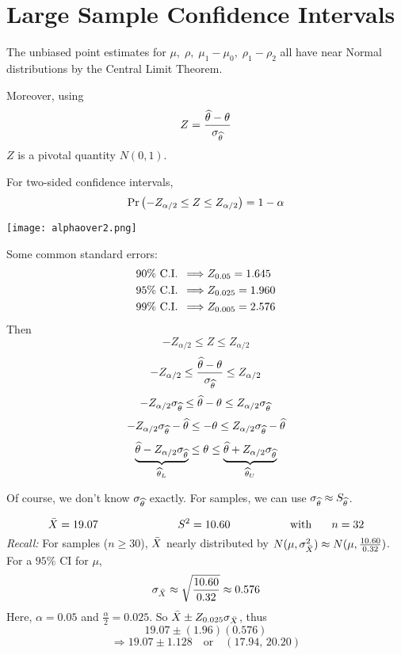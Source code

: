 \section{Large Sample Confidence Intervals}
   The unbiased point estimates for $\mu,\; \rho,\; \mu_1 - \mu_0,\; \rho_1 - \rho_2$ all have near Normal distributions by the Central Limit Theorem.
   
   \nl Moreover, using
   $$Z = \frac{\widehat{\theta}-\theta}{\sigma_{\widehat{\theta}}}$$
   $Z$ is a pivotal quantity $N(0,1)$.

   \nnl For two-sided confidence intervals,
   $$\P{-Z_{\alpha/2} \leq Z \leq Z_{\alpha/2}} = 1 - \alpha$$
   
   \nl \begin{center}\texttt{[image: alphaover2.png]}\end{center}

   \nl Some common standard errors:
   \begin{align}
    90\% \text{ C.I. } \,& \Longrightarrow Z_{0.05} = 1.645\notag\\
    95\% \text{ C.I. } \, &\Longrightarrow Z_{0.025} = 1.960\notag\\
    99\% \text{ C.I. } \, &\Longrightarrow Z_{0.005} = 2.576\notag
   \end{align}
   Then
   $$-Z_{\alpha/2}  \leq Z \leq Z_{\alpha/2}$$
   $$-Z_{\alpha/2}  \leq \frac{\widehat{\theta}-\theta}{\sigma_{\widehat{\theta}}} \leq Z_{\alpha/2}$$
   $$-Z_{\alpha/2} \sigma_{\widehat{\theta}}  \leq \widehat{\theta}-\theta \leq Z_{\alpha/2} \sigma_{\widehat{\theta}}$$
   $$-Z_{\alpha/2} \sigma_{\widehat{\theta}} - \widehat{\theta} \leq -\theta \leq Z_{\alpha/2} \sigma_{\widehat{\theta}} - \widehat{\theta}$$
   $$\underbrace{\widehat{\theta} - Z_{\alpha/2} \sigma_{\widehat{\theta}}}_{\widehat{\theta}_L} \leq \theta \leq  \underbrace{\widehat{\theta} + Z_{\alpha/2} \sigma_{\widehat{\theta}}}_{\widehat{\theta}_U}$$
           
    \noindent Of course, we don't know $\sigma_{\widehat{\theta}}$ exactly. For  samples, we can use $\sigma_{\widehat{\theta}} \approx S_{\widehat{\theta}}$.
    
    \example*
    $$\bar{X} = 19.07 \hspace{1in} S^2 = 10.60 \hspace{.75in}\text{with}\hspace{0.25in} n = 32$$
    \textit{Recall:} For  samples ($n \geq 30$), $\bar{X}$ nearly distributed by $N(\mu, \sigma^2_{\bar{X}}) \approx N(\mu, \frac{10.60}{0.32})$.
    \\For a $95\%$ CI for $\mu$,
    $$\sigma_{\bar{X}} \approx \sqrt{\frac{10.60}{0.32}} \approx 0.576$$
    Here, $\alpha = 0.05$ and $\frac{\alpha}{2} = 0.025$. So $\bar{X} \pm Z_{0.025} \sigma_{\bar{X}}$, thus
    $$19.07 \pm (1.96)(0.576)$$
    $$\Rightarrow 19.07 \pm 1.128 \quad \text{or} \quad (17.94,\, 20.20)$$

